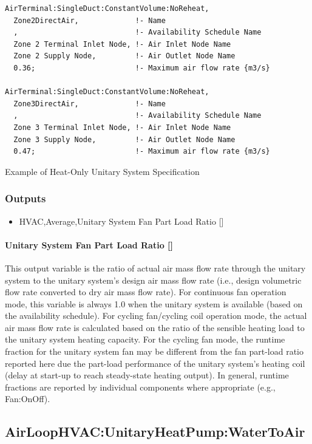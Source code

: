 \begin{lstlisting}
AirTerminal:SingleDuct:ConstantVolume:NoReheat,
  Zone2DirectAir,             !- Name
  ,                           !- Availability Schedule Name
  Zone 2 Terminal Inlet Node, !- Air Inlet Node Name
  Zone 2 Supply Node,         !- Air Outlet Node Name
  0.36;                       !- Maximum air flow rate {m3/s}

AirTerminal:SingleDuct:ConstantVolume:NoReheat,
  Zone3DirectAir,             !- Name
  ,                           !- Availability Schedule Name
  Zone 3 Terminal Inlet Node, !- Air Inlet Node Name
  Zone 3 Supply Node,         !- Air Outlet Node Name
  0.47;                       !- Maximum air flow rate {m3/s}
\end{lstlisting}

Example of Heat-Only Unitary System Specification

\subsubsection{Outputs}\label{outputs-5-011}

\begin{itemize}
\tightlist
\item
  HVAC,Average,Unitary System Fan Part Load Ratio {[]}
\end{itemize}

\paragraph{Unitary System Fan Part Load Ratio {[]}}\label{unitary-system-fan-part-load-ratio-6}

This output variable is the ratio of actual air mass flow rate through the unitary system to the unitary system's design air mass flow rate (i.e., design volumetric flow rate converted to dry air mass flow rate). For continuous fan operation mode, this variable is always 1.0 when the unitary system is available (based on the availability schedule). For cycling fan/cycling coil operation mode, the actual air mass flow rate is calculated based on the ratio of the sensible heating load to the unitary system heating capacity. For the cycling fan mode, the runtime fraction for the unitary system fan may be different from the fan part-load ratio reported here due the part-load performance of the unitary system's heating coil (delay at start-up to reach steady-state heating output). In general, runtime fractions are reported by individual components where appropriate (e.g., Fan:OnOff).

\subsection{AirLoopHVAC:UnitaryHeatPump:WaterToAir}\label{airloophvacunitaryheatpumpwatertoair}

